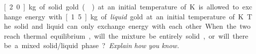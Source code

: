 \label{fnt1.2.1-8}

\unit[2.0]{kg} of solid gold () at an initial temperature of \unit[1000]{K} is allowed to exchange energy with \unit[1.5]{kg} of {\em liquid} gold at an initial temperature of \unit[1336]{K}. The solid and liquid can only exchange energy with each other. When the two reach thermal equilibrium, will the mixture be entirely solid, or will there be a mixed solid/liquid phase? {\em Explain how you know.}
